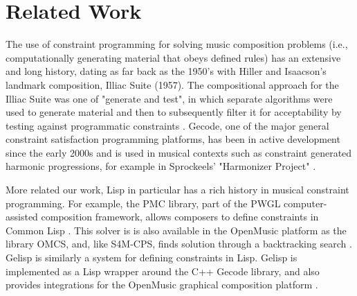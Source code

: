 \documentclass[pmlr]{jmlr}%
\begin{document}

\section{Related Work }
\label{sec:intro}

The use of constraint programming for solving music composition problems (i.e., computationally generating 
material that obeys defined rules) has an extensive and long history, dating as far back as the 1950's with
Hiller and Isaacson's landmark composition, Illiac Suite (1957). The compositional approach
for the Illiac Suite was one of "generate and test", in which separate algorithms were used
to generate material and then to subsequently filter it for acceptability by testing against 
programmatic constraints \citep{nierhaus2009algorithmic}. Gecode, one of the major general constraint satisfaction programming platforms, has been in 
active development since the early 2000s and is used in musical contexts such as constraint 
generated harmonic progressions, for example in Sprockeels' "Harmonizer Project" \citep{sprockeels2025towards}.

More related our work, Lisp in particular has a rich history in musical constraint programming. 
For example, the PMC library, part of the PWGL computer-assisted composition
framework, allows composers to define constraints in Common Lisp \citep{sandred2010pwmc}.
This solver is is also available in the OpenMusic platform as the library OMCS, 
and, like S4M-CPS, finds solution through a backtracking search \citep{dean2018oxford}. Gelisp is similarly a system for defining constraints in Lisp. Gelisp is implemented as 
a Lisp wrapper around the C++ Gecode library, and also provides integrations for the OpenMusic
graphical composition platform \citep{mauricio2015ntccrt}.
\end{document}
